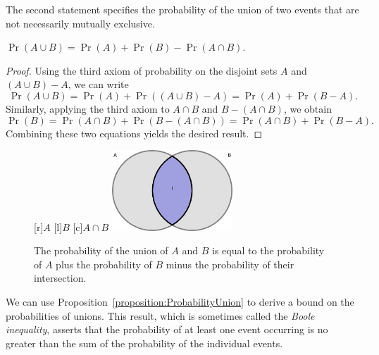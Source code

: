 The second statement specifies the probability of the union of two events that are not necessarily mutually exclusive.
\begin{proposition} \label{proposition:ProbabilityUnion}
$\Pr (A \cup B) = \Pr (A) + \Pr (B) - \Pr (A \cap B)$.
\end{proposition}
\begin{proof}
Using the third axiom of probability on the disjoint sets $A$ and $(A \cup B) - A$, we can write
\begin{equation*}
\Pr (A \cup B)
= \Pr (A) + \Pr ((A \cup B) - A)
= \Pr (A) + \Pr (B - A) .
\end{equation*}
Similarly, applying the third axiom to $A \cap B$ and $B - (A \cap B)$, we obtain
\begin{equation*}
\Pr (B)
= \Pr (A \cap B) + \Pr (B - (A \cap B))
= \Pr (A \cap B) + \Pr (B - A) .
\end{equation*}
Combining these two equations yields the desired result.
\end{proof}
\begin{figure}[htb!]
\begin{center}
\begin{psfrags}
[r]{$A$}
[l]{$B$}
[c]{$A \cap B$}
\includegraphics[height=3.03cm]{Figures/2Chapter/intersection}
\end{psfrags}
\caption{The probability of the union of $A$ and $B$ is equal to the probability of $A$ plus the probability of $B$ minus the probability of their intersection.}
\end{center}
\end{figure}

We can use Proposition~\ref{proposition:ProbabilityUnion} to derive a bound on the probabilities of unions.
This result, which is sometimes called the \emph{Boole inequality}, asserts that the probability of at least one event occurring is no greater than the sum of the probability of the individual events.

